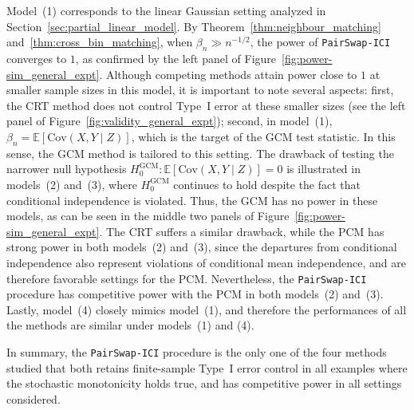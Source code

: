 \documentclass[12pt]{article}
\newcommand{\EE}[1]{\mathbb{E}\left[{#1}\right]}
\begin{document}
Model~(1) corresponds to the linear Gaussian setting analyzed in Section~\ref{sec:partial_linear_model}.  By Theorem~\ref{thm:neighbour_matching} and~\ref{thm:cross_bin_matching}, when $\beta_n \gg n^{-1/2}$, the power of \texttt{PairSwap-ICI} converges to $1$, as confirmed by the left panel of Figure~\ref{fig:power-sim_general_expt}. Although competing methods attain power close to $1$ at smaller sample sizes in this model, it is important to note several aspects: first, the CRT method does not control Type~I error at these smaller sizes (see the left panel of Figure~\ref{fig:validity_general_expt}); second, in model~(1), $\beta_n = \EE{\mathrm{Cov}(X,Y\mid Z)}$, which is the target of the GCM test statistic.  In this sense, the GCM method is tailored to this setting.  The drawback of testing the narrower null hypothesis  $H_0^{\mathrm{GCM}}: \EE{\mathrm{Cov}(X,Y\mid Z)}=0$ is illustrated in models~(2) and~(3), where $H_0^{\mathrm{GCM}}$ continues to hold despite the fact that conditional independence is violated.  Thus, the GCM has no power in these models, as can be seen in the middle two panels of Figure~\ref{fig:power-sim_general_expt}.  The CRT suffers a similar drawback, while the PCM has strong power in both models~(2) and~(3), since the departures from conditional independence also represent violations of conditional mean independence, and are therefore favorable settings for the PCM.  Nevertheless, the \texttt{PairSwap-ICI} procedure has competitive power with the PCM in both models~(2) and~(3).  Lastly, model~(4) closely mimics model~(1), and therefore the performances of all the methods are similar under models~(1) and (4).

In summary, the \texttt{PairSwap-ICI} procedure is the only one of the four methods studied that both retains finite-sample Type~I error control in all examples where the stochastic monotonicity holds true, and has competitive power in all settings considered.
\end{document}
